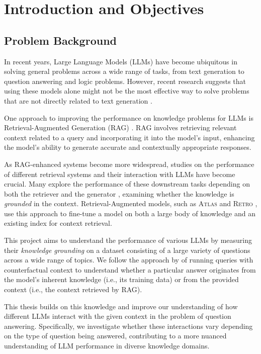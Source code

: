 \section{Introduction and Objectives}

\subsection{Problem Background}

In recent years, Large Language Models (LLMs) have become ubiquitous in solving general problems across a wide range of tasks, from text generation to question answering and logic problems.
However, recent research suggests that using these models alone might not be the most effective way to solve problems that are not directly related to text generation \citep{treeofthoughts}.

One approach to improving the performance on knowledge problems for LLMs is Retrieval-Augmented Generation (RAG) \citep{rag}. RAG involves retrieving relevant context related to a query and incorporating it into the model's input, enhancing the model's ability to generate accurate and contextually appropriate responses.

As RAG-enhanced systems become more widespread, studies on the performance of different retrieval systems and their interaction with LLMs have become crucial.
Many explore the performance of these downstream tasks depending on both the retriever and the generator \citep{can_rag_models_reason,fewshotlearners}, examining whether the knowledge is \textit{grounded} in the context.
Retrieval-Augmented models, such as \textsc{Atlas} \citep{atlas_foundational} and \textsc{Retro} \citep{retro}, use this approach to fine-tune a model on both a large body of knowledge and an existing index for context retrieval.

This project aims to understand the performance of various LLMs by measuring their \textit{knowledge grounding} on a dataset consisting of a large variety of questions across a wide range of topics.
We follow the approach by \citeauthor{factual_recall} of running queries with counterfactual context to understand whether a particular answer originates from the model's inherent knowledge (i.e., its training data) or from the provided context (i.e., the context retrieved by RAG).

This thesis builds on this knowledge and improve our understanding of how different LLMs interact with the given context in the problem of question answering.
Specifically, we investigate whether these interactions vary depending on the type of question being answered, contributing to a more nuanced understanding of LLM performance in diverse knowledge domains.

